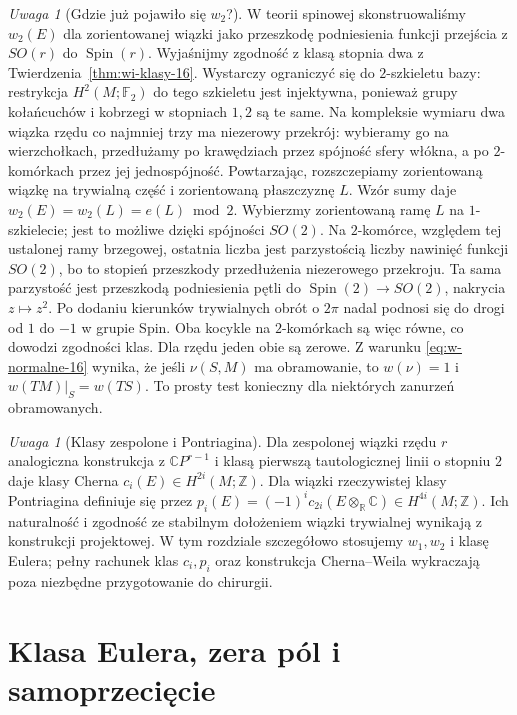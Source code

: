 \documentclass[11pt,a4paper,oneside]{report}
\newcommand{\R}{\mathbb{R}}
\newcommand{\C}{\mathbb{C}}
\newcommand{\Z}{\mathbb{Z}}
\theoremstyle{plain}
\theoremstyle{definition}
\theoremstyle{remark}
\newtheorem{uwaga}[twierdzenie]{Uwaga}
\begin{document}
\begin{uwaga}[Gdzie już pojawiło się $w_2$?]
W teorii spinowej
skonstruowaliśmy
$w_2(E)$ dla zorientowanej
wiązki jako przeszkodę
podniesienia funkcji
przejścia z $SO(r)$
do $\operatorname{Spin}(r)$.
Wyjaśnijmy zgodność z klasą stopnia dwa z
Twierdzenia~\ref{thm:wi-klasy-16}. Wystarczy ograniczyć
się do $2$-szkieletu bazy: restrykcja $H^2(M;\mathbb F_2)$
do tego szkieletu jest injektywna, ponieważ grupy
kołańcuchów i kobrzegi w stopniach $1,2$ są te same.
Na kompleksie wymiaru dwa wiązka rzędu co najmniej trzy
ma niezerowy przekrój: wybieramy go na wierzchołkach,
przedłużamy po krawędziach przez spójność sfery włókna,
a po $2$-komórkach przez jej jednospójność.
Powtarzając, rozszczepiamy zorientowaną wiązkę na
trywialną część i zorientowaną płaszczyznę $L$.
Wzór sumy daje $w_2(E)=w_2(L)=e(L)\bmod2$.
Wybierzmy zorientowaną ramę $L$ na $1$-szkielecie;
jest to możliwe dzięki spójności $SO(2)$.
Na $2$-komórce, względem tej ustalonej ramy brzegowej,
ostatnia liczba jest parzystością liczby nawinięć
funkcji $SO(2)$, bo to
stopień przeszkody przedłużenia niezerowego przekroju.
Ta sama parzystość jest przeszkodą podniesienia pętli
do $\operatorname{Spin}(2)\to SO(2)$, nakrycia $z\mapsto z^2$.
Po dodaniu kierunków trywialnych obrót o $2\pi$
nadal podnosi się do drogi od $1$ do $-1$ w grupie Spin.
Oba kocykle na $2$-komórkach są więc równe,
co dowodzi zgodności klas. Dla rzędu jeden obie są zerowe.
Z warunku
\eqref{eq:w-normalne-16}
wynika, że jeśli
$\nu(S,M)$ ma obramowanie,
to $w(\nu)=1$ i
$w(TM)|_S=w(TS)$.
To prosty test konieczny
dla niektórych zanurzeń
obramowanych.
\end{uwaga}

\begin{uwaga}[Klasy zespolone i Pontriagina]
Dla zespolonej wiązki
rzędu $r$ analogiczna
konstrukcja z
$\C P^{r-1}$
i klasą pierwszą
tautologicznej linii
o stopniu $2$
daje klasy Cherna
$c_i(E)\in H^{2i}(M;\Z)$.
Dla wiązki rzeczywistej
klasy Pontriagina
definiuje się przez
$p_i(E)=(-1)^i
c_{2i}(E\otimes_\R\C)
\in H^{4i}(M;\Z)$.
Ich naturalność i
zgodność ze stabilnym
dołożeniem wiązki
trywialnej wynikają
z konstrukcji projektowej.
W tym rozdziale
szczegółowo stosujemy
$w_1,w_2$ i klasę
Eulera; pełny rachunek
klas $c_i,p_i$
oraz konstrukcja
Cherna--Weila
wykraczają poza
niezbędne przygotowanie
do chirurgii.
\end{uwaga}

\section{Klasa Eulera, zera pól i samoprzecięcie}
\label{sec:klasy-eulera-16}
\end{document}
